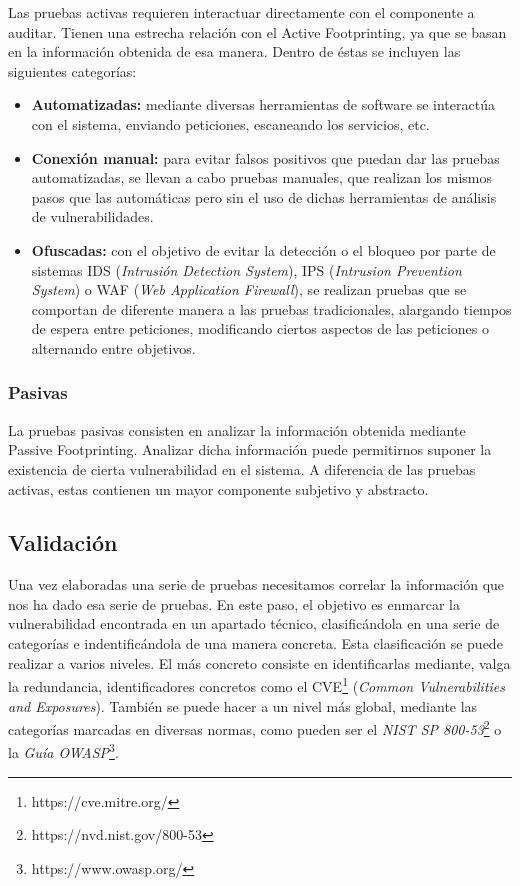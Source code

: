 Las pruebas activas requieren interactuar directamente con el componente a auditar. Tienen una estrecha relación con el Active Footprinting, ya que se basan en la información obtenida de esa manera. Dentro de éstas se incluyen las siguientes categorías:

\begin{itemize}
	\item \textbf{Automatizadas:} mediante diversas herramientas de software se interactúa con el sistema, enviando peticiones, escaneando los servicios, etc.
	\item \textbf{Conexión manual:} para evitar falsos positivos que puedan dar las pruebas automatizadas, se llevan a cabo pruebas manuales, que realizan los mismos pasos que las automáticas pero sin el uso de dichas herramientas de análisis de vulnerabilidades.
	\item \textbf{Ofuscadas:} con el objetivo de evitar la detección o el bloqueo por parte de sistemas IDS (\textit{Intrusión Detection System}), IPS (\textit{Intrusion Prevention System}) o WAF (\textit{Web Application Firewall}), se realizan pruebas que se comportan de diferente manera a las pruebas tradicionales, alargando tiempos de espera entre peticiones, modificando ciertos aspectos de las peticiones o alternando entre objetivos.
\end{itemize}

\subsubsection{Pasivas}

La pruebas pasivas consisten en analizar la información obtenida mediante Passive Footprinting. Analizar dicha información puede permitirnos suponer la existencia de cierta vulnerabilidad en el sistema. A diferencia de las pruebas activas, estas contienen un mayor componente subjetivo y abstracto.

\subsection{Validación}

Una vez elaboradas una serie de pruebas necesitamos correlar la información que nos ha dado esa serie de pruebas. En este paso, el objetivo es enmarcar la vulnerabilidad encontrada en un apartado técnico, clasificándola en una serie de categorías e indentificándola de una manera concreta. Esta clasificación se puede realizar a varios niveles.
El más concreto consiste en identificarlas mediante, valga la redundancia, identificadores concretos como el CVE\footnote{https://cve.mitre.org/} (\textit{Common Vulnerabilities and Exposures}). También se puede hacer a un nivel más global, mediante las categorías marcadas en diversas normas, como pueden ser el \emph{NIST SP 800-53}\footnote{https://nvd.nist.gov/800-53} o la \textit{Guía OWASP}\footnote{https://www.owasp.org/}.
	
